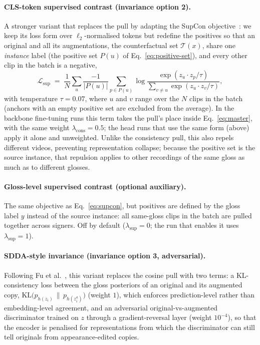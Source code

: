 \paragraph{CLS-token supervised contrast (invariance option 2).}
A stronger variant that replaces the pull by adapting the SupCon
objective~\cite{khosla2020supervised}: we keep its loss form over
$\ell_2$-normalised tokens but redefine the positives so that an
original and all its augmentations, the counterfactual set
$\mathcal{T}(x)$, share one \emph{instance} label (the positive set
$P(u)$ of Eq.~\eqref{eq:positive-set}), and every other clip in the
batch is a negative,
\begin{equation}
\label{eq:supcon}
\mathcal{L}_{\mathrm{sup}} \;=\;
\frac{1}{N}\sum_{u} \frac{-1}{|P(u)|} \sum_{p \in P(u)}
\log \frac{\exp(z_u \cdot z_p / \tau)}
{\sum_{v \neq u} \exp(z_u \cdot z_v / \tau)},
\end{equation}
with temperature $\tau = 0.07$, where $u$ and $v$ range over the $N$ clips
in the batch (anchors with an empty positive set are excluded from the
average). In the backbone fine-tuning runs this term takes the pull's
place inside Eq.~\eqref{eq:master}, with the
same weight $\lambda_{\mathrm{cons}} = 0.5$; the head runs that use the
same form (above) apply it alone and unweighted. Unlike the consistency pull, this also
repels different videos, preventing representation collapse; because the
positive set is the source instance, that repulsion applies to other
recordings of the same gloss as much as to different glosses.

\paragraph{Gloss-level supervised contrast (optional auxiliary).}
The same objective as Eq.~\eqref{eq:supcon}, but positives are defined by
the gloss label $y$ instead of the source instance: all same-gloss clips in
the batch are pulled together across signers. Off by default
($\lambda_{\mathrm{sup}}=0$; the run that enables it uses
$\lambda_{\mathrm{sup}}=1$).

\paragraph{SDDA-style invariance (invariance option 3, adversarial).}
Following Fu et al.~\cite{fuSignerDiversitydrivenData2024b}, this variant
replaces the cosine pull with two terms: a KL-consistency loss between the
gloss posteriors of an original and its augmented copy,
$\mathrm{KL}\bigl(p_{h(z_i)} \,\|\, p_{h(z_i^a)}\bigr)$ (weight $1$), which
enforces prediction-level rather than embedding-level agreement, and an
adversarial original-vs-augmented discriminator trained on $z$ through a
gradient-reversal layer (weight $10^{-4}$), so that the encoder is
penalised for representations from which the discriminator can still tell
originals from appearance-edited copies.

